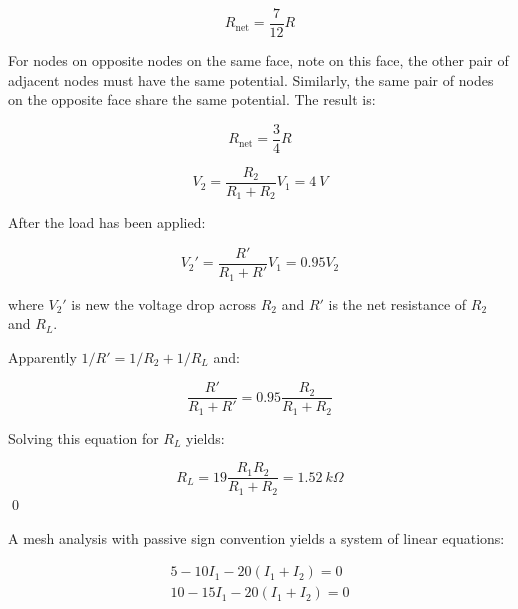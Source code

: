 \documentclass[12pt]{article}
\begin{document}
\begin{correction}
    \begin{equation}
        R_{\text{net}} = \frac{7}{12} R
    \end{equation}
\end{correction}

For nodes on opposite nodes on the same face, note on this face, the other pair of adjacent nodes must have the same potential. Similarly, the same pair of nodes on the opposite face share the same potential. The result is:

\begin{equation}
    R_{\text{net}} = \frac{3}{4} R
\end{equation}



\begin{equation}
    V_{2} = \frac{R_{2}}{R_{1} + R_{2}} V_{1} = \qty{4}{V}
\end{equation}

After the load has been applied:

\begin{equation}
    V_{2}' = \frac{R'}{R_{1} + R'} V_{1} = 0.95 V_{2}
\end{equation}

where $V_{2}'$ is new the voltage drop across $R_{2}$ and $R'$ is the net resistance of $R_{2}$ and $R_{L}$.

Apparently $1/R' = 1/R_{2} + 1/R_{L}$ and:

\begin{equation}
    \frac{R'}{R_{1} + R'} = 0.95 \frac{R_{2}}{R_{1} + R_{2}}
\end{equation}

Solving this equation for $R_{L}$ yields:

\begin{equation}
    R_{L} = 19 \frac{R_{1} R_{2}}{R_{1} + R_{2}} = \qty{1.52}{k\Omega}
\end{equation}
\qed


A mesh analysis with passive sign convention yields a system of linear equations:

\begin{equation}
\begin{split}
    5 - 10I_{1} - 20(I_{1} + I_{2}) = 0 \\
    10 - 15I_{1} - 20(I_{1} + I_{2}) = 0
\end{split}
\end{equation}
\end{document}

